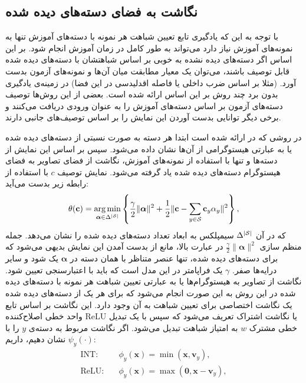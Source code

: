 \subsection{نگاشت به فضای دسته‌های دیده شده}
با توجه به این که یادگیری تابع تعیین شباهت هر نمونه با دسته‌های آموزش تنها به نمونه‌های آموزش نیاز دارد می‌تواند به طور کامل در زمان آموزش انجام شود. بر این اساس اگر دسته‌های دیده نشده به خوبی بر اساس شباهتشان با دسته‌های دیده شده قابل توصیف باشند، می‌توان یک معیار مطابقت میان آن‌ها و نمونه‌های آزمون بدست آورد. (مثلا بر اساس ضرب داخلی یا فاصله اقدلیدسی در این فضا) در زمینه‌ی یادگیری بدون برد چند روش بر این اساس ارائه شده است. بعضی از این روش‌ها توصیف دسته‌های آزمون بر اساس دسته‌های آموزش را به عنوان ورودی دریافت می‌کنند و برخی دیگر توانایی بدست آوردن این نمایش را بر اساس توصیف‌های جانبی دارند. 

در روشی که در 
\cite{sse}
ارائه شده است ابتدا هر دسته به صورت نسبتی از دسته‌های دیده شده یا به عبارتی هیستوگرامی از آن‌ها نشان داده می‌شود. سپس بر اساس این نمایش از دسته‌ها و تنها با استفاده از نمونه‌های آموزش، نگاشت از فضای تصاویر به فضای هیستوگرام دسته‌های دیده شده یاد گرفته می‌شود. نمایش توصیف $c$ با استفاده از رابطه زیر بدست می‌آید:
\begin{equation}\label{eqn:sse_source}
\theta(\mathbf{c})=
\operatorname*{arg\,min}_{\boldsymbol{\alpha}\in \Delta^{|{\cal S}|}} \left\{\frac{\gamma}{2}\|\boldsymbol{\alpha}\|^2+\frac{1}{2}\|\mathbf{c}-\sum_{y\in\mathcal{S}}\mathbf{c}_y \alpha_y\|^2\right\},
\end{equation}
که در آن 
$\Delta^{|{\cal S}|} $
سیمپلکس به ابعاد تعداد دسته‌های دیده شده را نشان می‌دهد. جمله منظم سازی $\frac{\gamma}{2}\|\boldsymbol{\alpha}\|^2$ در عبارت بالا، مانع از بدست آمدن این نمایش بدیهی می‌شود که برای دسته‌های دیده شده، تنها عنصر متناظر با همان دسته در $\boldsymbol{\alpha}$ یک شود و سایر درایه‌ها صفر. $\gamma$ یک فراپامتر در این مدل است که باید با اعتبارسنجی تعیین شود. 
نگاشت از تصاویر به هیستوگرام‌ها یا به عبارتی تعیین شباهت هر نمونه با دسته‌های دیده شده در این روش به این صورت انجام می‌شود که برای هر یک از دسته‌های دیده شده یک نگاشت اختصاصی برای تعیین شباهت به آن وجود دارد. 
این نگاشت بر اساس تابع واحد خطی اصلاح‌کننده ReLU یا نگاشت اشتراک 
 تعریف می‌شود که سپس با یک تبدیل خطی مشترک $w$ به امتیاز شباهت تبدیل می‌شود. اگر نگاشت مربوط به دسته‌ی $y$ را با $\psi_y(\cdot)$ نشان دهیم، داریم:
\begin{align}
\mbox{INT:} & \quad \phi_y(\mathbf{x})=\min(\mathbf{x}, \mathbf{v}_y), \label{eqn:int}\\
\mbox{ReLU:} & \quad \phi_y(\mathbf{x})=\max(\mathbf{0}, \mathbf{x}-\mathbf{v}_y), \label{eqn:relu}
\end{align}
